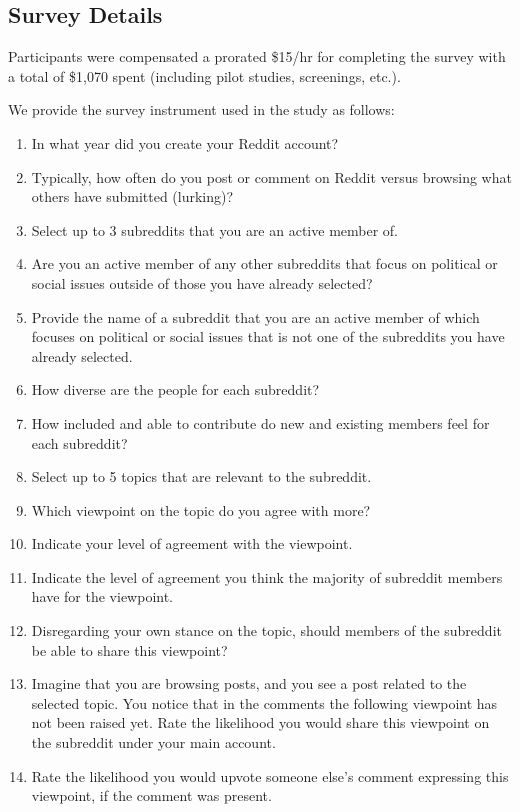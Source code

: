 \subsection{Survey Details}
Participants were compensated a prorated \$15/hr for completing the survey with a total of \$1,070 spent (including pilot studies, screenings, etc.). 

We provide the survey instrument used in the study as follows:
\begin{enumerate}
    \item In what year did you create your Reddit account?
\item Typically, how often do you post or comment on Reddit versus browsing what others have submitted (lurking)? 
\item Select up to 3 subreddits that you are an active member of. 
\item Are you an active member of any other subreddits that focus on political or social issues outside of those you have already selected? 
\item Provide the name of a subreddit that you are an active member of which focuses on political or social issues that is not one of the subreddits you have already selected. 
\item How diverse are the people for each subreddit? 
\item How included and able to contribute do new and existing members feel for each subreddit? 
\item Select up to 5 topics that are relevant to the subreddit. 
\item Which viewpoint on the topic do you agree with more? 
\item Indicate your level of agreement with the viewpoint. 
\item Indicate the level of agreement you think the majority of subreddit members have for the viewpoint.
\item Disregarding your own stance on the topic, should members of the subreddit be able to share this viewpoint? 
\item Imagine that you are browsing posts, and you see a post related to the selected topic. You notice that in the comments the following viewpoint has not been raised yet. Rate the likelihood you would share this viewpoint on the subreddit under your main account. 
\item Rate the likelihood you would upvote someone else’s comment expressing this viewpoint, if the comment was present.
\end{enumerate}

